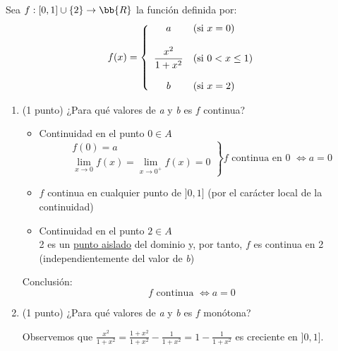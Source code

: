 \documentclass[12pt]{article}
\begin{document}
    \begin{ejercicio}[2.5 puntos]
        Sea $f:[0,1]\cup \{2\} \rightarrow \bb{R}$ la función definida por:
        \[
            f(x)=
            \left \{
            \begin{array}{c l}
                 a & \text{(si $x=0$)} \\ \\
                 \dfrac{x^2}{1+x^2} & \text{(si $0 < x \leq 1$)} \\ \\
                 b & \text{(si $x=2$)} \\
            \end{array}
            \right .
        \]

        \begin{enumerate}
            \item (1 punto) ¿Para qué valores de \textit{a} y \textit{b} es $f$ continua? 

            \begin{itemize}
                \item Continuidad en el punto $0\in A$
                \[
                \left.
                \begin{array}{l}
                    f(0)=a \\
                    \lim\limits_{x\to 0}f(x) = \lim\limits_{x\to 0^+}f(x) = 0
                \end{array}
                \right\} f \text{ continua en 0 } \Longleftrightarrow a=0
                \]

                \item  $f$ continua en cualquier punto de $]0,1]$ (por el carácter local de la continuidad)
                \item Continuidad en el punto $2\in A$ \\
                2 es un \underline{punto aislado} del dominio y, por tanto, $f$ es continua en 2 (independientemente del valor de \textit{b})
            \end{itemize}

            Conclusión:
            \[
                f \text{ continua }\Longleftrightarrow a=0
            \]
            
            \item (1 punto) ¿Para qué valores de \textit{a} y \textit{b} es $f$ monótona? 

            Observemos que $\frac{x^2}{1+x^2} = \frac{1+ x^2}{1+x^2} - \frac{1}{1+x^2} = 1 - \frac{1}{1+x^2}$ es creciente en $]0,1]$.\\
            

\end{enumerate}
\end{ejercicio}
\end{document}
